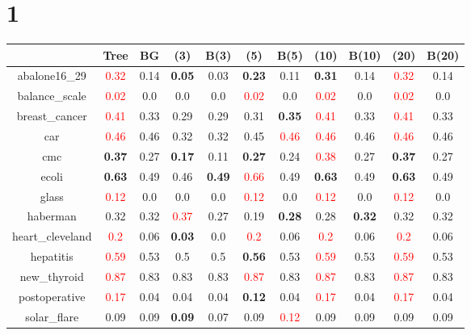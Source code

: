 \documentclass{article}%
\begin{document}
\section*{1}%
\begin{tabular}{c|cccccccccc}%
\hline%
&Tree&BG&(3)&B(3)&(5)&B(5)&(10)&B(10)&(20)&B(20)\\%
\hline%
abalone16\_29&\textcolor{red}{ 
0.32
}&0.14&\textbf{0.05}&0.03&\textbf{0.23}&0.11&\textbf{0.31}&0.14&\textcolor{red}{ 
0.32
}&0.14\\%
\hline%
balance\_scale&\textcolor{red}{ 
0.02
}&0.0&0.0&0.0&\textcolor{red}{ 
0.02
}&0.0&\textcolor{red}{ 
0.02
}&0.0&\textcolor{red}{ 
0.02
}&0.0\\%
\hline%
breast\_cancer&\textcolor{red}{ 
0.41
}&0.33&0.29&0.29&0.31&\textbf{0.35}&\textcolor{red}{ 
0.41
}&0.33&\textcolor{red}{ 
0.41
}&0.33\\%
\hline%
car&\textcolor{red}{ 
0.46
}&0.46&0.32&0.32&0.45&\textcolor{red}{ 
0.46
}&\textcolor{red}{ 
0.46
}&0.46&\textcolor{red}{ 
0.46
}&0.46\\%
\hline%
cmc&\textbf{0.37}&0.27&\textbf{0.17}&0.11&\textbf{0.27}&0.24&\textcolor{red}{ 
0.38
}&0.27&\textbf{0.37}&0.27\\%
\hline%
ecoli&\textbf{0.63}&0.49&0.46&\textbf{0.49}&\textcolor{red}{ 
0.66
}&0.49&\textbf{0.63}&0.49&\textbf{0.63}&0.49\\%
\hline%
glass&\textcolor{red}{ 
0.12
}&0.0&0.0&0.0&\textcolor{red}{ 
0.12
}&0.0&\textcolor{red}{ 
0.12
}&0.0&\textcolor{red}{ 
0.12
}&0.0\\%
\hline%
haberman&0.32&0.32&\textcolor{red}{ 
0.37
}&0.27&0.19&\textbf{0.28}&0.28&\textbf{0.32}&0.32&0.32\\%
\hline%
heart\_cleveland&\textcolor{red}{ 
0.2
}&0.06&\textbf{0.03}&0.0&\textcolor{red}{ 
0.2
}&0.06&\textcolor{red}{ 
0.2
}&0.06&\textcolor{red}{ 
0.2
}&0.06\\%
\hline%
hepatitis&\textcolor{red}{ 
0.59
}&0.53&0.5&0.5&\textbf{0.56}&0.53&\textcolor{red}{ 
0.59
}&0.53&\textcolor{red}{ 
0.59
}&0.53\\%
\hline%
new\_thyroid&\textcolor{red}{ 
0.87
}&0.83&0.83&0.83&\textcolor{red}{ 
0.87
}&0.83&\textcolor{red}{ 
0.87
}&0.83&\textcolor{red}{ 
0.87
}&0.83\\%
\hline%
postoperative&\textcolor{red}{ 
0.17
}&0.04&0.04&0.04&\textbf{0.12}&0.04&\textcolor{red}{ 
0.17
}&0.04&\textcolor{red}{ 
0.17
}&0.04\\%
\hline%
solar\_flare&0.09&0.09&\textbf{0.09}&0.07&0.09&\textcolor{red}{ 
0.12
}&0.09&0.09&0.09&0.09\\%

\end{tabular}
\end{document}
